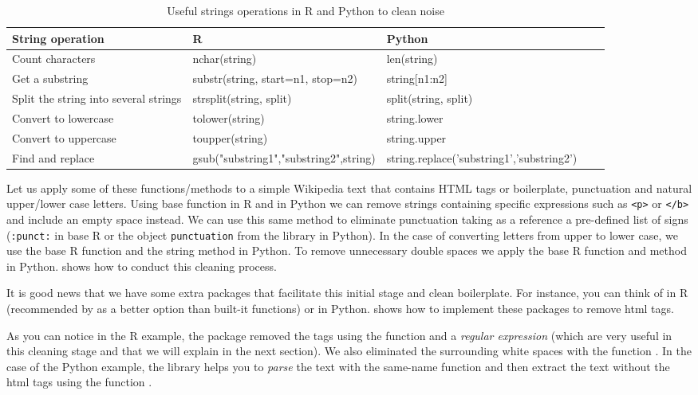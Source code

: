 \begin{table}
  \caption{\label{tab:stringoperations}Useful strings operations in R and Python to clean noise}{
  \begin{tabularx}{\textwidth}{lllll}
    \toprule
String operation      & R   & Python\\ \midrule
Count characters      & nchar(string) & len(string)  \\
Get a substring       & substr(string, start=n1, stop=n2) & string[n1:n2]            \\
Split the string into several strings   & strsplit(string, split) & split(string, split)             \\ 
Convert to lowercase  & tolower(string) & string.lower     \\ 
Convert to uppercase  & toupper(string) & string.upper     \\ 
Find and replace      & gsub("substring1","substring2",string) & string.replace('substring1','substring2') \\ 
    \bottomrule
  \end{tabularx}}{}
\end{table}

Let us apply some of these functions/methods to a simple Wikipedia text that contains HTML tags or boilerplate, punctuation and natural upper/lower case letters. Using base function  in R and  in Python we can remove strings containing specific expressions such as \texttt{<p>} or \texttt{</b>} and include an empty space instead. We can use this same method to eliminate punctuation taking as a reference a pre-defined list of signs (\texttt{:punct:} in base R or the object \texttt{punctuation} from the library  in Python). In the case of converting letters from upper to lower case, we use the base R function  and the string method  in Python. To remove unnecessary double spaces we apply the base R function  and method  in Python.  shows how to conduct this cleaning process.


It is good news that we have some extra packages that facilitate this initial stage and clean boilerplate. For instance, you can think of  in R (recommended by \citet{welbers2017text} as a better option than built-it functions) or  in Python.  shows how to implement these packages to remove html tags.


As you can notice in the R example, the package  removed the tags using the function  and a \emph{regular expression} (which are very useful in this cleaning stage and that we will explain in the next section). We also eliminated the surrounding white spaces with the function . In the case of the Python example, the library  helps you to \emph{parse} the text with the same-name function  and then extract the text without the html tags using the function .	